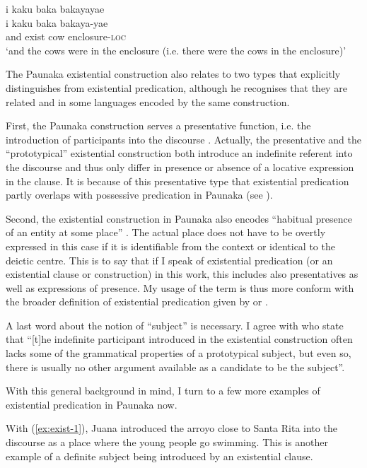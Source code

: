 \ea\label{ex:Exi-3}
\begingl
\glpreamble i kaku baka bakayayae\\
\gla i kaku baka bakaya-yae\\
\glb and exist cow enclosure-\textsc{loc}\\
\glft ‘and the cows were in the enclosure (i.e. there were the cows in the enclosure)’
\endgl
\trailingcitation{[jxx-p151016l-2.185]}
\xe


The Paunaka existential construction also relates to two types that \citet[]{Creissels2014} explicitly distinguishes from existential predication, although he recognises that they are related and in some languages encoded by the same construction.

First, the Paunaka construction serves a presentative function, i.e. the introduction of participants into the discourse \citep[cf.][15]{Creissels2014a}. Actually, the presentative and the “prototypical” existential construction both introduce an indefinite referent into the discourse and thus only differ in presence or absence of a locative expression in the clause. It is because of this presentative type that existential predication partly overlaps with possessive predication in Paunaka (see ). 

Second, the existential construction in Paunaka also encodes “habitual presence of an entity at some place” \citet[14]{Creissels2014a}. The actual place does not have to be overtly expressed in this case if it is identifiable from the context or identical to the deictic centre. This is to say that if I speak of existential predication (or an existential clause or construction) in this work, this includes also presentatives as well as expressions of  presence. My usage of the term is thus more conform with the broader definition of existential predication given by \citet[123--125]{Payne1997} or \citet[240--244]{Dryer2007}.  

A last word about the notion of “subject” is necessary. I agree with \citet[9]{Overall2018} who state that “[t]he indefinite participant introduced in the existential construction often lacks some of the grammatical properties of a prototypical subject, but even so, there is usually no other argument available as a candidate to be the subject”.

With this general background in mind, I turn to a few more examples of existential predication in Paunaka now.

With (\ref{ex:exist-1}), Juana introduced the arroyo close to Santa Rita into the discourse as a place where the young people go swimming. This is another example of a definite subject being introduced by an existential clause.

